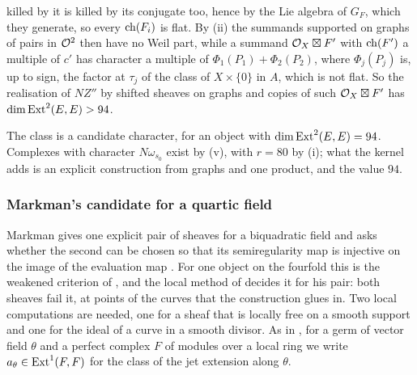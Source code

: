 \begin{remark}
\begin{enumerate}[label=\textup{(\alph*)},leftmargin=2.6em,itemsep=2pt]
  killed by it is killed by its conjugate too, hence by the Lie algebra of
  $G_{F}$, which they generate, so every $\operatorname{ch}(F_{i})$ is flat. By
  (ii) the summands supported on graphs of pairs
  in $\mathcal{O}^{2}$ then have no Weil part, while a summand $\mathcal{O}_{X}\boxtimes F'$
  with $\operatorname{ch}(F')$ a multiple of $c'$ has character a multiple of
  $\Phi_{1}(P_{1})+\Phi_{2}(P_{2})$, where $\Phi_{j}(P_{j})$ is, up to sign, the
  factor at $\tau_{j}$ of the class of $X\times\{0\}$ in $A$, which is not
  flat. So the realisation of $NZ''$ by shifted sheaves on graphs and copies
  of such $\mathcal{O}_{X}\boxtimes F'$ has $\dim\operatorname{Ext}^{2}(E,E)>94$.
\end{enumerate}
The class is a candidate character, for an object with
$\dim\operatorname{Ext}^{2}(E,E)=94$. Complexes with character $N\omega_{s_{0}}$ exist by
(v), with $r=80$ by (i);
what the kernel adds is an explicit construction from graphs and one product,
and the value $94$.
\end{remark}

\subsubsection*{Markman's candidate for a quartic field}

Markman gives one explicit pair of sheaves for a biquadratic field
\cite[Example~11.2.7, Lemma~11.2.8]{Mar25c} and asks whether the second can
be chosen so that its semiregularity map is injective on the image of the
evaluation map \cite[Question~11.2.2]{Mar25c}. For one object on the fourfold
this is the weakened criterion of , and the local
method of  decides it for his pair: both sheaves
fail it, at points of the curves that the construction glues in. Two local
computations are needed, one for a sheaf that is locally free on a smooth
support and one for the ideal of a curve in a smooth divisor. As in
, for a germ of vector field $\theta$ and a perfect
complex $F$ of modules over a local ring we write
$a_{\theta}\in\operatorname{Ext}^{1}(F,F)$ for the class of the jet extension along
$\theta$.

